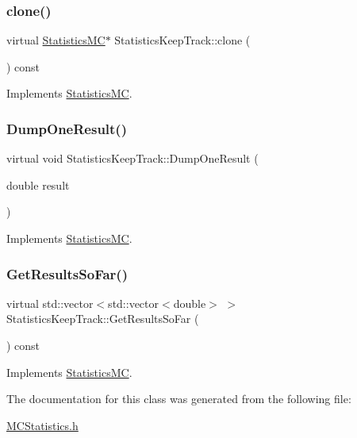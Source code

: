 \subsubsection{\texorpdfstring{clone()}{clone()}}
{\footnotesize\ttfamily virtual \hyperlink{classStatisticsMC}{Statistics\+MC}$\ast$ Statistics\+Keep\+Track\+::clone (\begin{DoxyParamCaption}{ }\end{DoxyParamCaption}) const\hspace{0.3cm}{\ttfamily [virtual]}}



Implements \hyperlink{classStatisticsMC_af716d17e088d36f283e112ba736f8002}{Statistics\+MC}.

\hypertarget{classStatisticsKeepTrack_aaee86e9b5d2223f0c07725056cd55c8b}{}\label{classStatisticsKeepTrack_aaee86e9b5d2223f0c07725056cd55c8b} 
\subsubsection{\texorpdfstring{Dump\+One\+Result()}{DumpOneResult()}}
{\footnotesize\ttfamily virtual void Statistics\+Keep\+Track\+::\+Dump\+One\+Result (\begin{DoxyParamCaption}\item[{double}]{result }\end{DoxyParamCaption})\hspace{0.3cm}{\ttfamily [virtual]}}



Implements \hyperlink{classStatisticsMC_a3ab5fb27d6933d8e35b2a55c3897cbe3}{Statistics\+MC}.

\hypertarget{classStatisticsKeepTrack_a836a4a0d70daeef85410eff352d8fcf9}{}\label{classStatisticsKeepTrack_a836a4a0d70daeef85410eff352d8fcf9} 
\subsubsection{\texorpdfstring{Get\+Results\+So\+Far()}{GetResultsSoFar()}}
{\footnotesize\ttfamily virtual std\+::vector$<$std\+::vector$<$double$>$ $>$ Statistics\+Keep\+Track\+::\+Get\+Results\+So\+Far (\begin{DoxyParamCaption}{ }\end{DoxyParamCaption}) const\hspace{0.3cm}{\ttfamily [virtual]}}



Implements \hyperlink{classStatisticsMC_ae29a294b6db36c2bf46c20ac30e25aad}{Statistics\+MC}.



The documentation for this class was generated from the following file\+:\begin{DoxyCompactItemize}
\item 
\hyperlink{MCStatistics_8h}{M\+C\+Statistics.\+h}\end{DoxyCompactItemize}
